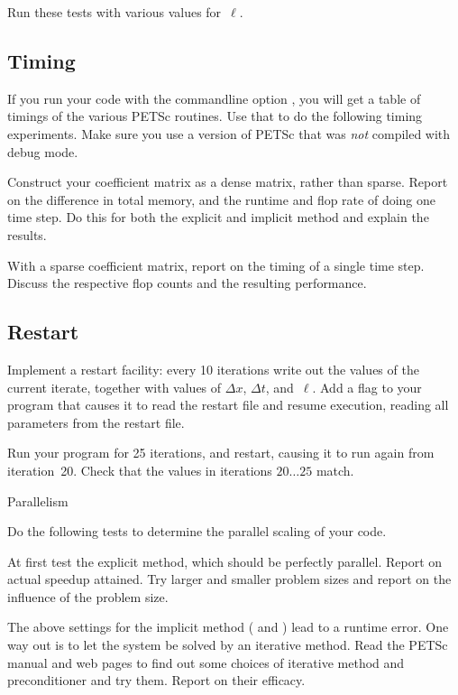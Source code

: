 Run these tests with various values for~$\ell$.

\subsection*{Timing}

If you run your code with the commandline option , you
will get a table of timings of the various PETSc routines. Use that to do
the following timing experiments. Make sure you use a version of PETSc
that was \emph{not} compiled with debug mode.

Construct your coefficient matrix as a dense matrix, rather than
sparse. Report on the difference in total memory, and the runtime and
flop rate of doing one time step. Do this for both the explicit and
implicit method and explain the results.

With a sparse coefficient matrix, report on the timing of a
  single time step. Discuss the respective flop counts and the
  resulting performance.


\subsection*{Restart}

Implement a restart facility: every 10 iterations write out the
values of the current iterate, together with values of $\Delta x$,
$\Delta t$, and~$\ell$. Add a flag  to your program that
causes it to read the restart file and resume execution, reading all
parameters from the restart file.

Run your program for 25 iterations, and restart, causing it to run
again from iteration~20. Check that the values in iterations
$20\ldots25$ match.

 {Parallelism}

Do the following tests to determine the parallel scaling of your code.

At first test the explicit method, which should be perfectly
  parallel. Report on actual speedup attained. Try larger and smaller
  problem sizes and report on the influence of the problem size.

The above settings for the implicit method ( and
) lead to a runtime error. One way out is to let the system be
solved by an iterative method. Read the PETSc manual and web pages to
find out some choices of iterative method and preconditioner and try
them. Report on their efficacy.

